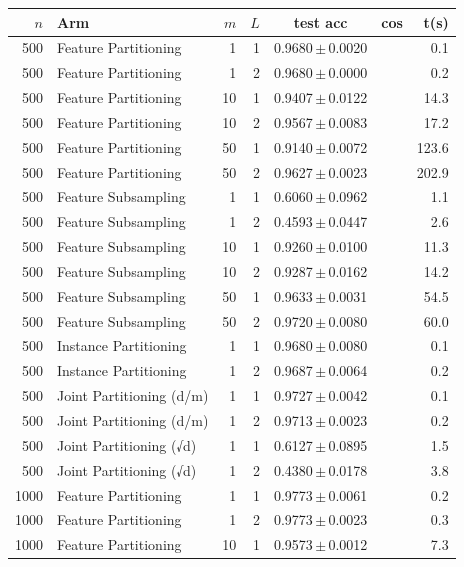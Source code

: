 \begin{table}[ht]
\centering\small
\begin{tabular}{rlrrccr}
\toprule
$n$ & Arm & $m$ & $L$ & test acc & cos & t(s) \\
\midrule
500 & Feature Partitioning & 1 & 1 & 0.9680\,$\pm$\,0.0020 &  & 0.1 \\
500 & Feature Partitioning & 1 & 2 & 0.9680\,$\pm$\,0.0000 &  & 0.2 \\
500 & Feature Partitioning & 10 & 1 & 0.9407\,$\pm$\,0.0122 &  & 14.3 \\
500 & Feature Partitioning & 10 & 2 & 0.9567\,$\pm$\,0.0083 &  & 17.2 \\
500 & Feature Partitioning & 50 & 1 & 0.9140\,$\pm$\,0.0072 &  & 123.6 \\
500 & Feature Partitioning & 50 & 2 & 0.9627\,$\pm$\,0.0023 &  & 202.9 \\
500 & Feature Subsampling & 1 & 1 & 0.6060\,$\pm$\,0.0962 &  & 1.1 \\
500 & Feature Subsampling & 1 & 2 & 0.4593\,$\pm$\,0.0447 &  & 2.6 \\
500 & Feature Subsampling & 10 & 1 & 0.9260\,$\pm$\,0.0100 &  & 11.3 \\
500 & Feature Subsampling & 10 & 2 & 0.9287\,$\pm$\,0.0162 &  & 14.2 \\
500 & Feature Subsampling & 50 & 1 & 0.9633\,$\pm$\,0.0031 &  & 54.5 \\
500 & Feature Subsampling & 50 & 2 & 0.9720\,$\pm$\,0.0080 &  & 60.0 \\
500 & Instance Partitioning & 1 & 1 & 0.9680\,$\pm$\,0.0080 &  & 0.1 \\
500 & Instance Partitioning & 1 & 2 & 0.9687\,$\pm$\,0.0064 &  & 0.2 \\
500 & Joint Partitioning (d/m) & 1 & 1 & 0.9727\,$\pm$\,0.0042 &  & 0.1 \\
500 & Joint Partitioning (d/m) & 1 & 2 & 0.9713\,$\pm$\,0.0023 &  & 0.2 \\
500 & Joint Partitioning (√d) & 1 & 1 & 0.6127\,$\pm$\,0.0895 &  & 1.5 \\
500 & Joint Partitioning (√d) & 1 & 2 & 0.4380\,$\pm$\,0.0178 &  & 3.8 \\
1000 & Feature Partitioning & 1 & 1 & 0.9773\,$\pm$\,0.0061 &  & 0.2 \\
1000 & Feature Partitioning & 1 & 2 & 0.9773\,$\pm$\,0.0023 &  & 0.3 \\
1000 & Feature Partitioning & 10 & 1 & 0.9573\,$\pm$\,0.0012 &  & 7.3 \\

\end{tabular}
\end{table}
